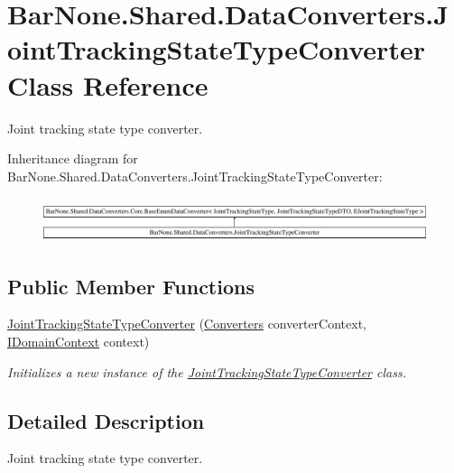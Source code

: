 \hypertarget{class_bar_none_1_1_shared_1_1_data_converters_1_1_joint_tracking_state_type_converter}{}\section{Bar\+None.\+Shared.\+Data\+Converters.\+Joint\+Tracking\+State\+Type\+Converter Class Reference}
\label{class_bar_none_1_1_shared_1_1_data_converters_1_1_joint_tracking_state_type_converter}


Joint tracking state type converter.  


Inheritance diagram for Bar\+None.\+Shared.\+Data\+Converters.\+Joint\+Tracking\+State\+Type\+Converter\+:\begin{figure}[H]
\begin{center}
\leavevmode
\includegraphics[height=1.305361cm]{class_bar_none_1_1_shared_1_1_data_converters_1_1_joint_tracking_state_type_converter}
\end{center}
\end{figure}
\subsection*{Public Member Functions}
\begin{DoxyCompactItemize}
\item 
\mbox{\hyperlink{class_bar_none_1_1_shared_1_1_data_converters_1_1_joint_tracking_state_type_converter_a23d38da410982f6220a1a6e62257bb97}{Joint\+Tracking\+State\+Type\+Converter}} (\mbox{\hyperlink{class_bar_none_1_1_shared_1_1_data_converters_1_1_converters}{Converters}} converter\+Context, \mbox{\hyperlink{interface_bar_none_1_1_shared_1_1_core_1_1_i_domain_context}{I\+Domain\+Context}} context)
\begin{DoxyCompactList}\small\item\em Initializes a new instance of the \mbox{\hyperlink{class_bar_none_1_1_shared_1_1_data_converters_1_1_joint_tracking_state_type_converter}{Joint\+Tracking\+State\+Type\+Converter}} class. \end{DoxyCompactList}\end{DoxyCompactItemize}


\subsection{Detailed Description}
Joint tracking state type converter. 

